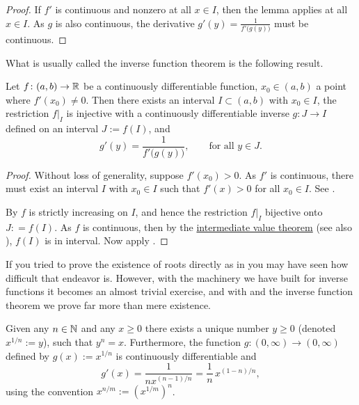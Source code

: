 \begin{proof}
If $f'$ is continuous and nonzero at all $x \in I$,
then the lemma applies at all $x \in I$.  As $g$ is also
continuous, the derivative $g'(y) =
\frac{1}{f'\bigl(g(y)\bigr)}$ must be continuous.
\end{proof}

What is usually called the inverse function theorem is the following result.

\begin{thm}
Let $f \colon (a,b) \to {\mathbb{R}}$ be a continuously differentiable function,
$x_0 \in (a,b)$ a point where $f'(x_0) \not= 0$.  Then there exists
an interval $I \subset (a,b)$ with $x_0 \in I$, the
restriction $f|_{I}$ is injective with a continuously differentiable inverse
$g \colon J \to I$ defined on an interval $J := f(I)$,
and
\begin{equation*}
g'(y) = \frac{1}{f'\bigl( g(y) \bigr)} , \qquad \text{for all $y \in J$}.
\end{equation*}
\end{thm}

\begin{proof}
Without loss of generality, suppose $f'(x_0) > 0$.  As $f'$ is
continuous, there must exist an interval $I$ with $x_0 \in I$
such that $f'(x) > 0$ for all $x_0 \in I$.  See
.

By  $f$ is strictly increasing
on $I$, and hence the restriction $f|_{I}$ bijective onto $J: = f(I)$.
As $f$ is continuous, then by the
\hyperref[IVT:thm]{intermediate value theorem}
(see also ), $f(I)$ is in interval.
Now apply .
\end{proof}

If you tried to prove the existence of roots directly as in
 you may have seen
how difficult that endeavor is.  However, with the machinery we have built
for inverse functions it becomes
an almost trivial exercise, and with and the inverse function theorem
we prove far more than mere existence.

\begin{cor}
Given any $n \in {\mathbb{N}}$ and any $x \geq 0$ there exists a unique 
number $y \geq 0$ (denoted $x^{1/n} := y$), such that $y^n = x$.  Furthermore,
the function $g \colon (0,\infty) \to (0,\infty)$ defined by
$g(x) := x^{1/n}$ is continuously differentiable and
\begin{equation*}
g'(x) = \frac{1}{nx^{(n-1)/n}} = \frac{1}{n} \, x^{(1-n)/n} ,
\end{equation*}
using the convention $x^{n/m} := {(x^{1/m})}^{n}$.
\end{cor}

